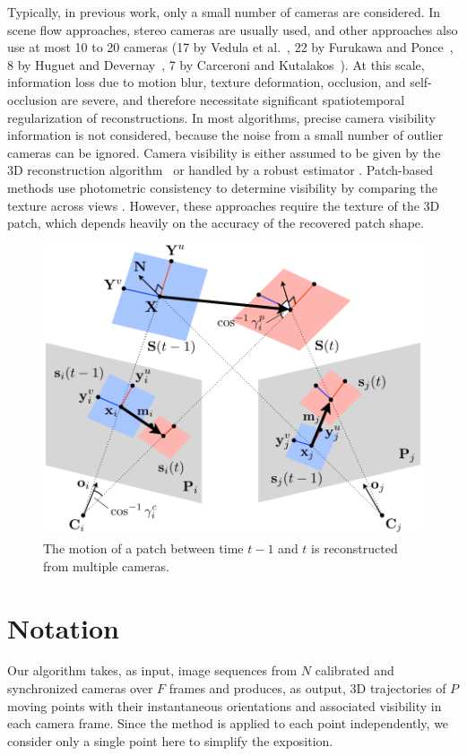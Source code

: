 Typically, in previous work, only a small number of cameras are considered. In scene flow approaches, stereo cameras are usually used, and other approaches also use at most 10 to 20 cameras (17 by Vedula et al.~\cite{Vedula2005}, 22 by Furukawa and Ponce~\cite{Furukawa-2008}, 8 by Huguet and Devernay~\cite{Huguet2007}, 7 by Carceroni and Kutalakos~\cite{Carceroni2002}). At this scale, information loss due to motion blur, texture deformation, occlusion, and self-occlusion are severe, and therefore necessitate significant spatiotemporal regularization of reconstructions. In most algorithms, precise camera visibility information is not considered, because the noise from a small number of outlier cameras can be ignored. Camera visibility is either assumed to be given by the 3D reconstruction algorithm~\cite{Vedula2005} or handled by a robust estimator \cite{Vogel2011,Devernay2006,Basha2012a,Quiroga2012}. Patch-based methods use photometric consistency to determine visibility by comparing the texture across views \cite{Carceroni2002,Devernay2006,Furukawa-2008}. However, these approaches require the texture of the 3D patch, which depends heavily on the accuracy of the recovered patch shape.


\begin{figure}[t]
	\begin{center}
		\includegraphics[width=0.6\linewidth]{figures/Notation_final}
		\caption{The motion of a patch between time $t-1$ and $t$ is reconstructed from multiple cameras.}
		\label{fig:notation}
	\end{center}
\end{figure}
\section{Notation}
Our algorithm takes, as input, image sequences from $N$ calibrated and synchronized cameras over $F$ frames and produces, as output, 3D trajectories of $P$ moving points with their instantaneous orientations and associated visibility in each camera frame. Since the method is applied to each point independently, we consider only a single point here to simplify the exposition.

